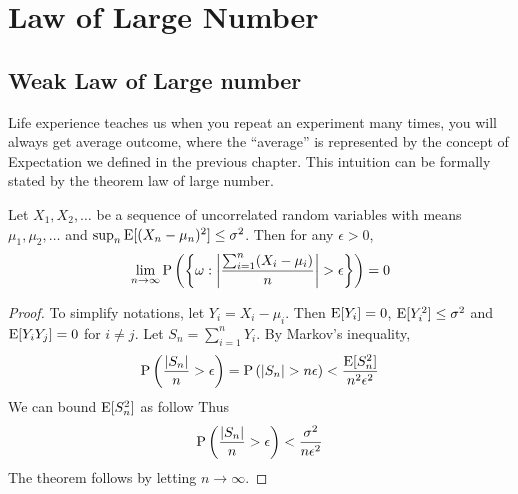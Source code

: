 \section{Law of Large Number}
\subsection{Weak Law of Large number}
Life experience teaches us when you repeat an experiment many times, you will always get average outcome, where the ``average'' is represented by the concept of Expectation we defined in the previous chapter. This intuition can be formally stated by the theorem law of large number.

\begin{theorem}
	Let $X_1, X_2,\ldots$ be a sequence of uncorrelated random variables with means $\mu_1, \mu_2, \ldots$ and $\sup_n \E[(X_n - \mu_n)^2] \leq \sigma^2$. Then for any $\epsilon>0$,
	$$\lim_{n\to \infty} \P \left(\left\{\omega: \left| \frac{\sum_{i=1}^{n} (X_i-\mu_i)}{n} \right| >\epsilon \right\}\right) = 0$$
\end{theorem}
\begin{proof}
	To simplify notations, let $Y_i = X_i-\mu_i$. Then $\E[Y_i]=0$, $\E[Y_i^2]\leq \sigma^2$ and $\E[Y_iY_j] = 0$ for $i\neq j$. Let $S_n = \sum_{i=1}^{n} Y_i$. By Markov's inequality,
	$$\P\left( \frac{|S_n|}{n} > \epsilon \right) = \P\left( |S_n| > n\epsilon \right) < \frac{\E[S_n^2]}{n^2\epsilon^2} $$
	We can bound $\E[S_n^2]$ as follow
 	Thus
 	$$\P\left( \frac{|S_n|}{n} > \epsilon \right) < \frac{\sigma^2}{n\epsilon^2}$$
 	The theorem follows by letting $n\to \infty$.
\end{proof}

